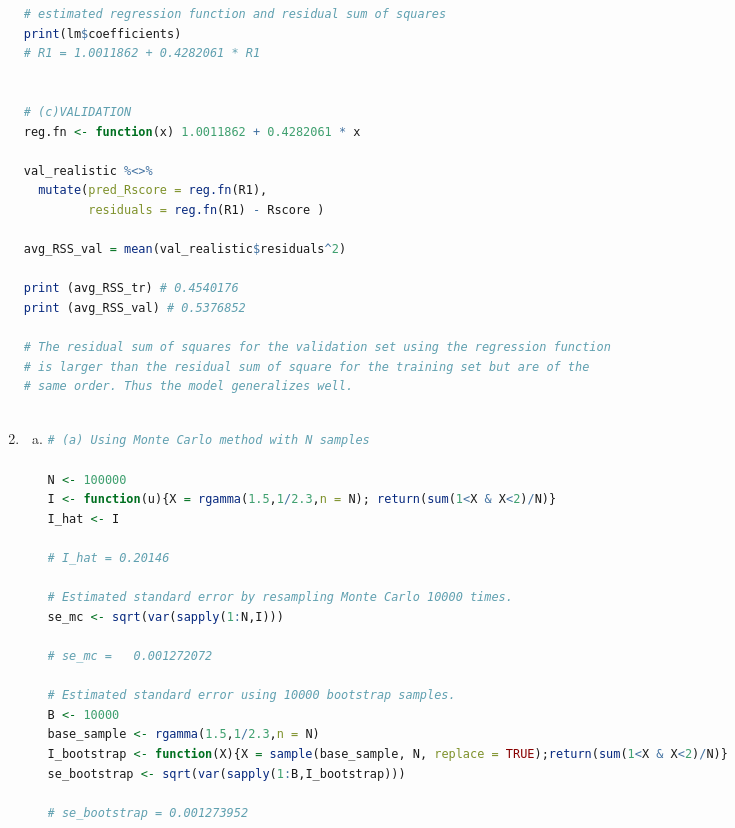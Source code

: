 \documentclass[a4paper,10pt]{article}
\theoremstyle{definition}
\begin{document}
\begin{enumerate}
\begin{lstlisting}[language=R,commentstyle=\fontseries{lc}\color{gray}]
# estimated regression function and residual sum of squares
print(lm$coefficients)
# R1 = 1.0011862 + 0.4282061 * R1


# (c)VALIDATION
reg.fn <- function(x) 1.0011862 + 0.4282061 * x

val_realistic %<>%
  mutate(pred_Rscore = reg.fn(R1),
         residuals = reg.fn(R1) - Rscore )

avg_RSS_val = mean(val_realistic$residuals^2)

print (avg_RSS_tr) # 0.4540176
print (avg_RSS_val) # 0.5376852

# The residual sum of squares for the validation set using the regression function
# is larger than the residual sum of square for the training set but are of the
# same order. Thus the model generalizes well.



\end{lstlisting}
\item
\begin{enumerate}[(a)]
\item 

\begin{lstlisting}[language=R,commentstyle=\fontseries{lc}\color{gray}]
# (a) Using Monte Carlo method with N samples

N <- 100000
I <- function(u){X = rgamma(1.5,1/2.3,n = N); return(sum(1<X & X<2)/N)}
I_hat <- I

# I_hat = 0.20146

# Estimated standard error by resampling Monte Carlo 10000 times.
se_mc <- sqrt(var(sapply(1:N,I)))

# se_mc =   0.001272072

# Estimated standard error using 10000 bootstrap samples.
B <- 10000
base_sample <- rgamma(1.5,1/2.3,n = N)
I_bootstrap <- function(X){X = sample(base_sample, N, replace = TRUE);return(sum(1<X & X<2)/N)}
se_bootstrap <- sqrt(var(sapply(1:B,I_bootstrap)))

# se_bootstrap = 0.001273952


\end{lstlisting}
\end{enumerate}
\end{enumerate}
\end{document}
